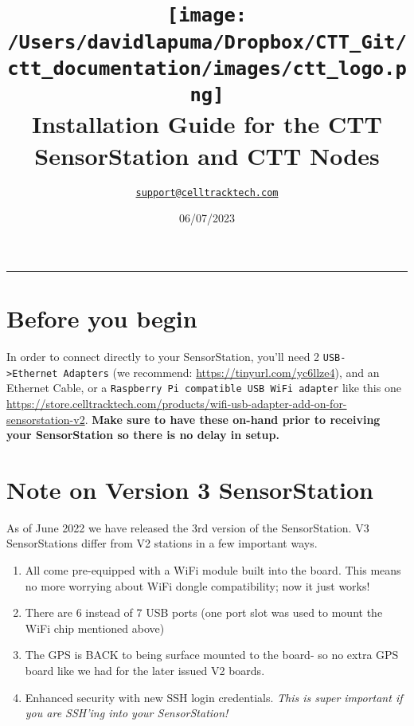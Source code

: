 \documentclass[
]{article}
\title{\texttt{[image: /Users/davidlapuma/Dropbox/CTT\_Git/ctt\_documentation/images/ctt\_logo.png]}\\
Installation Guide for the CTT SensorStation and CTT Nodes}
\author{\href{mailto:support@celltracktech.com}{\nolinkurl{support@celltracktech.com}}}
\date{06/07/2023}
\providecommand{\tightlist}{%
  \setlength{\itemsep}{0pt}\setlength{\parskip}{0pt}}
\begin{document}
\maketitle

{
\setcounter{tocdepth}{2}
\tableofcontents
}
\begin{center}\rule{0.5\linewidth}{0.5pt}\end{center}

\hypertarget{before-you-begin}{%
\section{Before you begin}\label{before-you-begin}}

In order to connect directly to your SensorStation, you'll need 2
\texttt{USB-\textgreater{}Ethernet\ Adapters} (we recommend:
\url{https://tinyurl.com/yc6llze4}), and an Ethernet Cable, or a
\texttt{Raspberry\ Pi\ compatible\ USB\ WiFi\ adapter} like this one
\url{https://store.celltracktech.com/products/wifi-usb-adapter-add-on-for-sensorstation-v2}.
\textbf{Make sure to have these on-hand prior to receiving your
SensorStation so there is no delay in setup.}

\hypertarget{note-on-version-3-sensorstation}{%
\section{Note on Version 3
SensorStation}\label{note-on-version-3-sensorstation}}

As of June 2022 we have released the 3rd version of the SensorStation.
V3 SensorStations differ from V2 stations in a few important ways.

\begin{enumerate}
\def\labelenumi{\arabic{enumi}.}
\tightlist
\item
  All come pre-equipped with a WiFi module built into the board. This
  means no more worrying about WiFi dongle compatibility; now it just
  works!
\item
  There are 6 instead of 7 USB ports (one port slot was used to mount
  the WiFi chip mentioned above)
\item
  The GPS is BACK to being surface mounted to the board- so no extra GPS
  board like we had for the later issued V2 boards.
\item
  Enhanced security with new SSH login credentials. \emph{This is super
  important if you are SSH'ing into your SensorStation!}
\end{enumerate}
\end{document}
